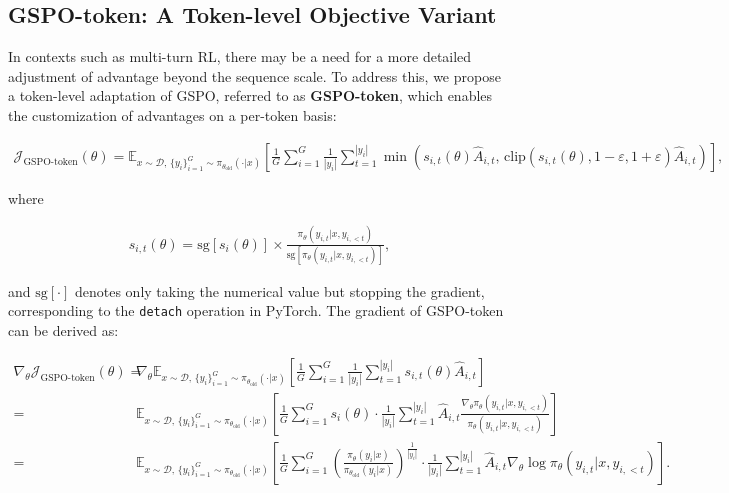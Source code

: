 \subsection{GSPO-token: A Token-level Objective Variant}

In contexts such as multi-turn RL, there may be a need for a more detailed adjustment of advantage beyond the sequence scale. To address this, we propose a token-level adaptation of GSPO, referred to as \textbf{GSPO-token}, which enables the customization of advantages on a per-token basis:

\begin{align}
\mathcal{J}_\text{GSPO-token}(\theta)
=
\mathbb{E}_{ x \sim \mathcal{D},\, \{y_i\}_{i=1}^G \sim \pi_{\theta_\text{old}}( \cdot | x) }
\left[ 
\frac{1}{G} \sum_{i=1}^{G} \frac{1}{|y_i|} \sum_{t=1}^{|y_i|} 
\min \left( s_{i,t}(\theta) \widehat{A}_{i,t},  \, \mathrm{clip} \left( s_{i,t}(\theta), 1 - {\varepsilon}, 1 + {\varepsilon} \right) \widehat{A}_{i,t} \right) 
\right],
\label{equ:gspo-token}
\end{align}

where

\begin{align}
s_{i,t}(\theta) 
= \mathrm{sg} \left[ s_{i}(\theta) \right]  \times \frac{ \pi_{\theta} (y_{i,t} | x, y_{i,<t}) }{ \mathrm{sg} \left[ \pi_{\theta} (y_{i,t} | x, y_{i,<t}) \right] },
\end{align}

and $\mathrm{sg}[\cdot]$ denotes only taking the numerical value but stopping the gradient, corresponding to the \texttt{detach} operation in PyTorch. The gradient of GSPO-token can be derived as:

\begin{align}
\nabla_{\theta} \mathcal{J}_\text{GSPO-token}(\theta)
=&\ 
\nabla_{\theta} \mathbb{E}_{x \sim \mathcal{D},\, \{y_i\}_{i=1}^G \sim \pi_{\theta_\text{old}}(\cdot | x)}
\left[ 
\frac{1}{G} \sum_{i=1}^{G}
\frac{1}{|y_i|} \sum_{t=1}^{|y_i|} 
s_{i,t}(\theta) \widehat{A}_{i,t}
\right] \\
=&\ 
\mathbb{E}_{x \sim \mathcal{D},\, \{y_i\}_{i=1}^G \sim \pi_{\theta_\text{old}}(\cdot | x)}
\left[ 
\frac{1}{G} \sum_{i=1}^{G} s_i(\theta) \cdot \frac{1}{|y_i|} \sum_{t=1}^{|y_i|} 
\widehat{A}_{i,t} \frac{\nabla_{\theta} \pi_{\theta}(y_{i,t} | x, y_{i,<t})}{\pi_{\theta}(y_{i,t} | x, y_{i,<t})}
\right] \\
=&\ 
\mathbb{E}_{x \sim \mathcal{D},\, \{y_i\}_{i=1}^G \sim \pi_{\theta_\text{old}}(\cdot | x)}
\left[ 
\frac{1}{G} \sum_{i=1}^{G} \left( \frac{\pi_{\theta}(y_i | x)}{\pi_{\theta_\text{old}}(y_i | x)} \right)^{\frac{1}{|y_i|}}
\cdot \frac{1}{|y_i|} \sum_{t=1}^{|y_i|}
\widehat{A}_{i,t} \nabla_{\theta} \log \pi_{\theta}(y_{i,t} | x, y_{i,<t})  
\right].
\label{equ:gspo-token_grad}
\end{align}

